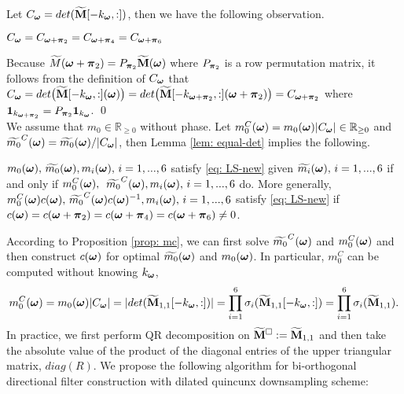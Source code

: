 Let $C_{\boldsymbol{\omega}} = det(\widetilde{\mathbf{M}}[-k_{\boldsymbol{\omega}},:])$, then we have the following observation.
\begin{lemma}\label{lem: equal-det}
$C_{\boldsymbol{\omega}} = C_{\boldsymbol{\omega}+\boldsymbol{\pi}_2} = C_{\boldsymbol{\omega}+\boldsymbol{\pi}_4} = C_{\boldsymbol{\omega}+\boldsymbol{\pi}_6}$
\end{lemma}
Because $\widetilde{M}(\boldsymbol{\omega}+\boldsymbol{\pi}_2) = P_{\boldsymbol{\pi}_2}\widetilde{\mathbf{M}}(\boldsymbol{\omega})$ where $P_{\boldsymbol{\pi}_2}$ is a row permutation matrix, it follows from the definition of $C_{\boldsymbol{\omega}}$ that 
$C_{\boldsymbol{\omega}} = det\big(\widetilde{\mathbf{M}}[-k_{\boldsymbol{\omega}},:](\boldsymbol{\omega})\big) = det\big(\widetilde{\mathbf{M}}[-k_{\boldsymbol{\omega}+\boldsymbol{\pi}_2},:](\boldsymbol{\omega}+\boldsymbol{\pi}_2) \big)= C_{\boldsymbol{\omega}+\boldsymbol{\pi}_2}$ where 
$\mathbf{1}_{k_{\boldsymbol{\omega}+\boldsymbol{\pi}_2}} = P_{\boldsymbol{\pi}_2}\mathbf{1}_{k_{\boldsymbol{\omega}}}$.
\qed\\[1em]
We assume that $m_0\in\mathbb{R}_{\geq 0}$ without phase. Let $m_0^C(\boldsymbol{\omega}) = m_0(\boldsymbol{\omega})|C_{\boldsymbol{\omega}}|\in \mathbb{R}_{\geq 0}$ and $\widetilde{m_{0}}^C(\boldsymbol{\omega}) = \widetilde{m_{0}}(\boldsymbol{\omega})/|C_{\boldsymbol{\omega}}|$, then Lemma \ref{lem: equal-det} implies the following.
\begin{proposition}\label{prop: mc}
$m_0(\boldsymbol{\omega}),\,\widetilde{m_{0}}(\boldsymbol{\omega}), m_i(\boldsymbol{\omega}),\,  i = 1,...,6$ satisfy \eqref{eq: LS-new} given $\widetilde{m_{i}}(\boldsymbol{\omega}),\,i=1,...,6$ if and only if $m_0^C(\boldsymbol{\omega}),$ $\,\widetilde{m_{0}}^C(\boldsymbol{\omega}), m_i(\boldsymbol{\omega}),\,i = 1,...,6$ do. More generally, $m_0^C(\boldsymbol{\omega})c(\boldsymbol{\omega}),\,\widetilde{m_{0}}^C(\boldsymbol{\omega})c(\boldsymbol{\omega})^{-1}, m_i(\boldsymbol{\omega}),\,i=1,...,6$ satisfy \eqref{eq: LS-new} if $c(\boldsymbol{\omega}) = c(\boldsymbol{\omega}+\boldsymbol{\pi}_2)=c(\boldsymbol{\omega}+\boldsymbol{\pi}_4) = c(\boldsymbol{\omega}+\boldsymbol{\pi}_6) \neq 0$.
\end{proposition}
According to Proposition \ref{prop: mc}, we can first solve $\widetilde{m_{0}}^C(\boldsymbol{\omega})$ and $m_0^C(\boldsymbol{\omega})$ and then construct $c(\boldsymbol{\omega})$ for optimal $\widetilde{m_{0}}(\boldsymbol{\omega})$ and $m_0(\boldsymbol{\omega})$. 
In particular, $m_0^C$ can be computed without knowing $k_{\boldsymbol{\omega}}$,
\begin{align}\label{eq: m0C}
m_0^C(\boldsymbol{\omega}) = m_0(\boldsymbol{\omega})|C_{\boldsymbol{\omega}}| = |det(\widetilde{\mathbf{M}}_{1,1}[-k_{\boldsymbol{\omega}},:])| = \prod_{i=1}^6\sigma_i(\widetilde{\mathbf{M}}_{1,1}[-k_{\boldsymbol{\omega}},:]) = \prod_{i=1}^6\sigma_i(\widetilde{\mathbf{M}}_{1,1}).
\end{align}
In practice, we first perform QR decomposition on $\widetilde{\mathbf{M}}^{\Box}:=\widetilde{\mathbf{M}}_{1,1}$ and then take the absolute value of the product of the diagonal entries of the upper triangular matrix, $diag(R)$. 
We propose the following algorithm for bi-orthogonal directional filter construction with dilated quincunx downsampling scheme:
